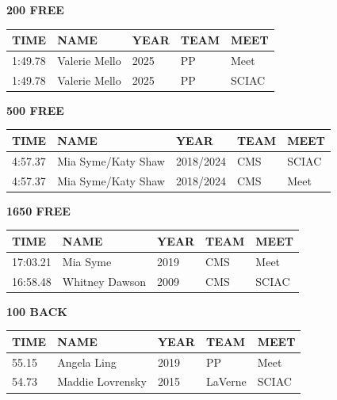 \begin{table}[H]
\centering
\begin{minipage}[t]{0.48\textwidth}
\centering
\textbf{200 FREE}\\[0.1cm]
\begin{tabular}{@{}p{1.8cm}p{2.8cm}p{1.2cm}p{1.4cm}p{1.4cm}@{}}
\hline
    \textbf{TIME} & \textbf{NAME} & \textbf{YEAR} & \textbf{TEAM} & \textbf{MEET} \\
\hline
    1:49.78 & Valerie Mello & 2025 & PP & Meet \\
    1:49.78 & Valerie Mello & 2025 & PP & SCIAC \\
\hline
\end{tabular}
\end{minipage}\hfill
\begin{minipage}[t]{0.48\textwidth}
\centering
\textbf{500 FREE}\\[0.1cm]
\begin{tabular}{@{}p{1.8cm}p{2.8cm}p{1.2cm}p{1.4cm}p{1.4cm}@{}}
\hline
    \textbf{TIME} & \textbf{NAME} & \textbf{YEAR} & \textbf{TEAM} & \textbf{MEET} \\
\hline
    4:57.37 & Mia Syme/Katy Shaw & 2018/2024 & CMS & SCIAC \\
    4:57.37 & Mia Syme/Katy Shaw & 2018/2024 & CMS & Meet \\
\hline
\end{tabular}
\end{minipage}
\end{table}

\begin{table}[H]
\centering
\begin{minipage}[t]{0.48\textwidth}
\centering
\textbf{1650 FREE}\\[0.1cm]
\begin{tabular}{@{}p{1.8cm}p{2.8cm}p{1.2cm}p{1.4cm}p{1.4cm}@{}}
\hline
    \textbf{TIME} & \textbf{NAME} & \textbf{YEAR} & \textbf{TEAM} & \textbf{MEET} \\
\hline
    17:03.21 & Mia Syme & 2019 & CMS & Meet \\
    16:58.48 & Whitney Dawson & 2009 & CMS & SCIAC \\
\hline
\end{tabular}
\end{minipage}\hfill
\begin{minipage}[t]{0.48\textwidth}
\centering
\textbf{100 BACK}\\[0.1cm]
\begin{tabular}{@{}p{1.8cm}p{2.8cm}p{1.2cm}p{1.4cm}p{1.4cm}@{}}
\hline
    \textbf{TIME} & \textbf{NAME} & \textbf{YEAR} & \textbf{TEAM} & \textbf{MEET} \\
\hline
    55.15 & Angela Ling & 2019 & PP & Meet \\
    54.73 & Maddie Lovrensky & 2015 & LaVerne & SCIAC \\
\hline
\end{tabular}
\end{minipage}
\end{table}

